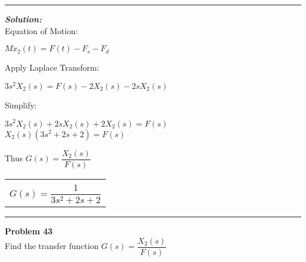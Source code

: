 \documentclass[11pt,letterpaper]{article}
\begin{document}
\rule{\textwidth}{1pt}
\vspace{12pt}
\textit{\textbf{Solution:}}\\
Equation of Motion:\\
\begin{center}
	$M\ddot{x}_2(t)=F(t)-F_s-F_d$\\[12pt]
\end{center}
Apply Laplace Transform:\\
\begin{center}
	$3s^2X_2(s)=F(s)-2X_2(s)-2sX_2(s)$\\
\end{center}
Simplify:\\
\begin{center}
	$3s^2X_2(s)+2sX_2(s)+2X_2(s)=F(s)$\\[12pt]
	$X_2(s)(3s^2+2s+2)=F(s)$\\[12pt]
\end{center}
Thus $G(s)=\dfrac{X_2(s)}{F(s)}$\\
\begin{center}
	\begin{tabular}{|c|}
		\hline \\
		$G(s)=\dfrac{1}{3s^2+2s+2}$\\[12pt]
		\hline
	\end{tabular}	
\end{center}

\clearpage

\rule{\textwidth}{1pt}
\textbf{Problem 43}\\
Find the transfer function $G(s)=\dfrac{X_2(s)}{F(s)}$\\
\end{document}
